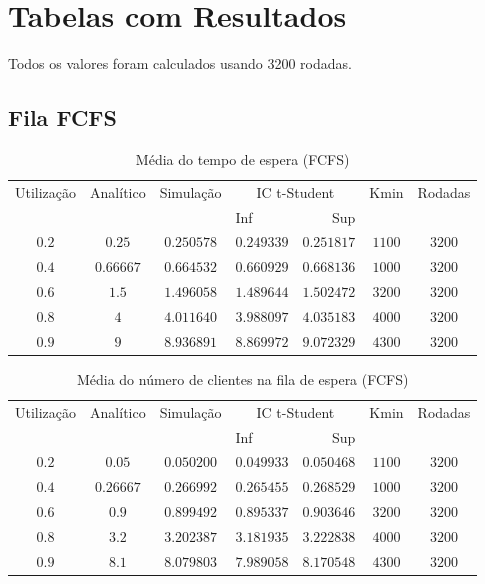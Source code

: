 \documentclass[a4paper]{article}
\begin{document}
\newpage
\section{Tabelas com Resultados}
Todos os valores foram calculados usando 3200 rodadas.

\subsection{Fila FCFS}
\begin{table}[h!]
    \centering
    \begin{tabular}{|c|c|c|lr|c|c|}\hline
        \multirow{2}{4.35em}{Utilização}
            & \multirow{2}{3.95em}{Analítico}
            & \multirow{2}{4.4em}{Simulação}
            & \multicolumn{2}{|c|}{IC t-Student}
            & \multirow{2}{2.4em}{Kmin}
            & \multirow{2}{3.75em}{Rodadas} \\
        &&& Inf & Sup &&\\\hline
        $ 0.2 $&$ 0.25 $&$ 0.250578 $&$ 0.249339 $&$ 0.251817 $&$
            1100 $&$ 3200 $\\
        $ 0.4 $&$ 0.66667 $&$ 0.664532 $&$ 0.660929 $&$ 0.668136 $&$
            1000 $&$ 3200 $\\\hline
        $ 0.6 $&$ 1.5 $&$ 1.496058 $&$ 1.489644 $&$ 1.502472 $&$
            3200 $&$ 3200 $\\
        $ 0.8 $&$ 4 $&$ 4.011640 $&$ 3.988097 $&$ 4.035183 $&$
            4000 $&$ 3200 $\\\hline
        $ 0.9 $&$ 9 $&$ 8.936891 $&$ 8.869972 $&$ 9.072329 $&$
            4300 $&$ 3200 $\\\hline
    \end{tabular}
    \caption{Média do tempo de espera (FCFS)}
\end{table}

\begin{table}[h!]
    \centering
    \begin{tabular}{|c|c|c|lr|c|c|}\hline
        \multirow{2}{4.35em}{Utilização}
            & \multirow{2}{3.95em}{Analítico}
            & \multirow{2}{4.4em}{Simulação}
            & \multicolumn{2}{|c|}{IC t-Student}
            & \multirow{2}{2.4em}{Kmin}
            & \multirow{2}{3.75em}{Rodadas} \\
        &&& Inf & Sup &&\\\hline
        $ 0.2 $&$ 0.05 $&$ 0.050200 $&$ 0.049933 $&$ 0.050468 $&$
            1100 $&$ 3200 $\\
        $ 0.4 $&$ 0.26667 $&$ 0.266992 $&$ 0.265455 $&$ 0.268529 $&$
            1000 $&$ 3200 $\\\hline
        $ 0.6 $&$ 0.9 $&$ 0.899492 $&$ 0.895337 $&$ 0.903646 $&$
            3200 $&$ 3200 $\\
        $ 0.8 $&$ 3.2 $&$ 3.202387 $&$ 3.181935 $&$ 3.222838 $&$
            4000 $&$ 3200 $\\\hline
        $ 0.9 $&$ 8.1 $&$ 8.079803 $&$ 7.989058 $&$ 8.170548 $&$
            4300 $&$ 3200 $\\\hline
    \end{tabular}
    \caption{Média do número de clientes na fila de espera (FCFS)}
\end{table}
\end{document}
